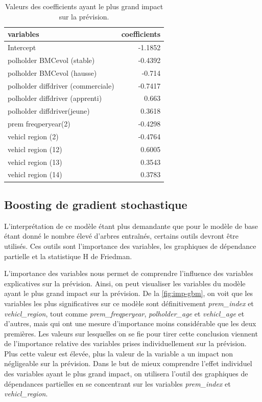 \documentclass[]{article}
\begin{document}
\begin{table}[ht]
\centering
\caption{Valeurs des coefficients ayant le plus grand impact sur la prévision.} 
\label{tbl:betas}
\begin{tabular}{lr}
  \hline
variables & coefficients \\ 
  \hline
Intercept & -1.1852 \\ 
  polholder BMCevol (stable) & -0.4392 \\ 
  polholder BMCevol (hausse) & -0.714 \\ 
  polholder diffdriver (commerciale) & -0.7417 \\ 
  polholder diffdriver (apprenti) & 0.663 \\ 
  polholder diffdriver(jeune) & 0.3618 \\ 
  prem freqperyear(2) & -0.4298 \\ 
  vehicl region (2) & -0.4764 \\ 
  vehicl region (12) & 0.6005 \\ 
  vehicl region (13) & 0.3543 \\ 
  vehicl region (14) & 0.3783 \\ 
   \hline
\end{tabular}
\end{table}

\newpage

\subsection{Boosting de gradient
stochastique}\label{boosting-de-gradient-stochastique-1}

L'interprétation de ce modèle étant plus demandante que pour le modèle
de base étant donné le nombre élevé d'arbres entraînés, certains outils
devront être utilisés. Ces outils sont l'importance des variables, les
graphiques de dépendance partielle et la statistique H de Friedman.

L'importance des variables nous permet de comprendre l'influence des
variables explicatives sur la prévision. Ainsi, on peut visualiser les
variables du modèle ayant le plus grand impact sur la prévision. De la
\autoref{fig:imp-gbm}, on voit que les variables les plus significatives
sur ce modèle sont définitivement \emph{prem\_index} et
\emph{vehicl\_region}, tout comme \emph{prem\_freqperyear},
\emph{polholder\_age} et \emph{vehicl\_age} et d'autres, mais qui ont
une mesure d'importance moins considérable que les deux premières. Les
valeurs sur lesquelles on se fie pour tirer cette conclusion viennent de
l'importance relative des variables prises individuellement sur la
prévision. Plus cette valeur est élevée, plus la valeur de la variable a
un impact non négligeable sur la prévision. Dans le but de mieux
comprendre l'effet individuel des variables ayant le plus grand impact,
on utilisera l'outil des graphiques de dépendances partielles en se
concentrant sur les variables \emph{prem\_index} et
\emph{vehicl\_region}.
\end{document}
